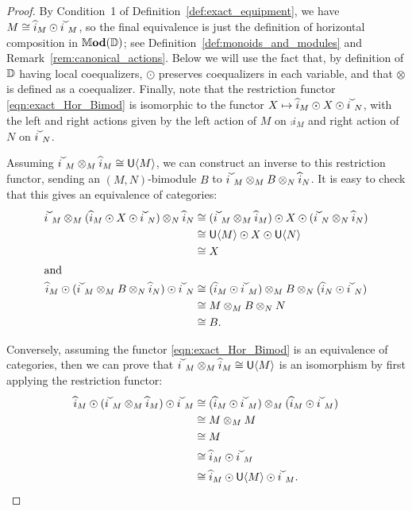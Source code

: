 \documentclass[11pt,oneside,article]{memoir}
\begin{document}
\begin{proof}
  By Condition~1 of Definition~\ref{def:exact_equipment}, we have $M\iso\comp{i}_M\odot\conj{i}_M$,
  so the final equivalence is just the definition of horizontal composition in $\mathbb{M}\mathbf{od}(\mathbb{D})$;
  see Definition~\ref{def:monoids_and_modules} and Remark~\ref{rem:canonical_actions}. Below we will
  use the fact that, by definition of $\mathbb{D}$ having local coequalizers, $\odot$ preserves
  coequalizers in each variable, and that $\otimes$ is defined as a coequalizer. Finally, note that
  the restriction functor \eqref{eqn:exact_Hor_Bimod} is isomorphic to the functor
  $X\mapsto\comp{i}_M\odot X\odot\conj{i}_N$, with the left and right actions given by the left
  action of $M$ on $\comp{i}_M$ and right action of $N$ on $\conj{i}_N$.

  Assuming $\conj{i}_M\otimes_M\comp{i}_M\iso\unit\Col{M}$, we can construct an inverse to this
  restriction functor, sending an $(M,N)$-bimodule $B$ to $\conj{i}_M\otimes_M
  B\otimes_N\comp{i}_N$. It is easy to check that this gives an equivalence of categories:
  \begin{align*}
    \conj{i}_M\otimes_M (\comp{i}_M\odot X\odot\conj{i}_N)\otimes_N\comp{i}_N
      &\iso (\conj{i}_M\otimes_M\comp{i}_M)\odot X\odot (\conj{i}_N\otimes_N\comp{i}_N) \\
      &\iso \unit\Col{M}\odot X\odot \unit\Col{N} \\
      &\iso X \\
    \intertext{and}
    \comp{i}_M\odot (\conj{i}_M\otimes_M B\otimes_N\comp{i}_N)\odot \conj{i}_N
      &\iso (\comp{i}_M\odot\conj{i}_M)\otimes_M B\otimes_N (\comp{i}_N\odot\conj{i}_N) \\
      &\iso M\otimes_M B\otimes_N N \\
      &\iso B.
  \end{align*}

  Conversely, assuming the functor \eqref{eqn:exact_Hor_Bimod} is an equivalence of categories, then
  we can prove that $\conj{i}_M\otimes_M\comp{i}_M\iso\unit\Col{M}$ is an isomorphism by first
  applying the restriction functor:
  \begin{align*}
    \comp{i}_M\odot(\conj{i}_M\otimes_M\comp{i}_M)\odot\conj{i}_M
      &\iso (\comp{i}_M\odot\conj{i}_M)\otimes_M(\comp{i}_M\odot\conj{i}_M) \\
      &\iso M\otimes_M M \\
      &\iso M \\
      &\iso \comp{i}_M\odot\conj{i}_M \\
      &\iso \comp{i}_M\odot\unit\Col{M}\odot\conj{i}_M. \qedhere
  \end{align*}
\end{proof}
\end{document}
